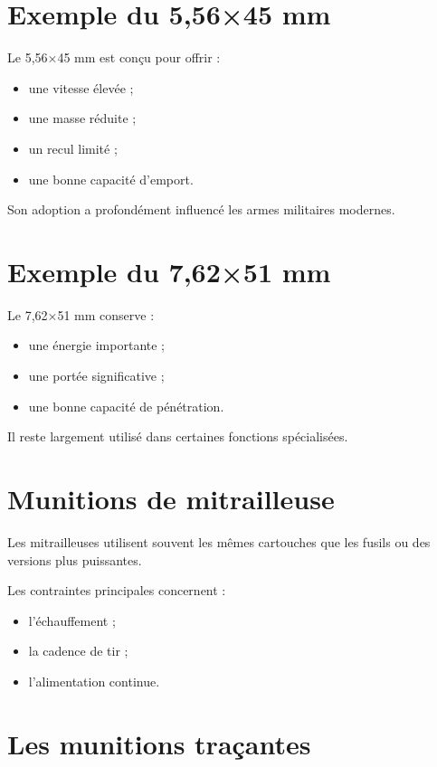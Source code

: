 \section{Exemple du 5,56×45 mm}

Le 5,56×45 mm est conçu pour offrir :

\begin{itemize}
    \item une vitesse élevée ;
    \item une masse réduite ;
    \item un recul limité ;
    \item une bonne capacité d'emport.
\end{itemize}

Son adoption a profondément influencé les armes militaires modernes.

\section{Exemple du 7,62×51 mm}

Le 7,62×51 mm conserve :

\begin{itemize}
    \item une énergie importante ;
    \item une portée significative ;
    \item une bonne capacité de pénétration.
\end{itemize}

Il reste largement utilisé dans certaines fonctions spécialisées.

\section{Munitions de mitrailleuse}

Les mitrailleuses utilisent souvent les mêmes cartouches que les fusils ou des
versions plus puissantes.

Les contraintes principales concernent :

\begin{itemize}
    \item l'échauffement ;
    \item la cadence de tir ;
    \item l'alimentation continue.
\end{itemize}

\section{Les munitions traçantes}

